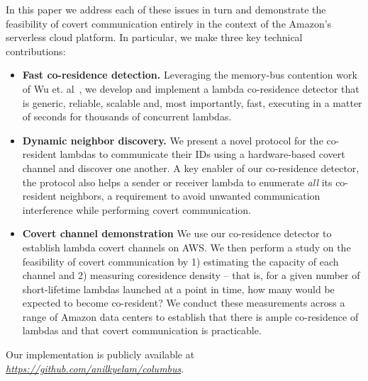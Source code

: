 In this paper we address each of these issues in turn and demonstrate
the feasibility of covert communication entirely in the context of the
Amazon's serverless cloud platform.  In particular, we make three key technical
contributions:
\begin{itemize}
\item{\bf{Fast co-residence detection.}}  Leveraging the memory-bus contention
  work of Wu et. al~\cite{wuusenix2012}, we develop and implement a
  lambda co-residence detector that is generic, reliable, scalable
  and, most importantly, fast, executing in a matter of seconds for thousands of
  concurrent lambdas.
\item{\bf{Dynamic neighbor discovery.}}  We present a novel protocol for  
  the co-resident lambdas to communicate their IDs using a hardware-based 
  covert channel and discover one another. A key enabler of our co-residence detector,
  the protocol also helps a sender or receiver lambda to enumerate \emph{all} 
  its co-resident neighbors, a requirement to avoid unwanted communication 
  interference while performing covert communication.
\item{\bf{Covert channel demonstration}}  We use our co-residence detector to 
  establish lambda covert channels on AWS. We then perform a study on the 
  feasibility of covert communication by 1) estimating the capacity of each 
  channel and 2) measuring coresidence density -- that is, for a given
  number of short-lifetime lambdas launched at a point in time, how
  many would be expected to become co-resident?  We conduct these
  measurements across a range of Amazon data centers to establish that
  there is ample co-residence of lambdas and that covert communication is practicable.
\end{itemize}


Our implementation is publicly available at 
\textit{\url{https://github.com/anilkyelam/columbus}}.

